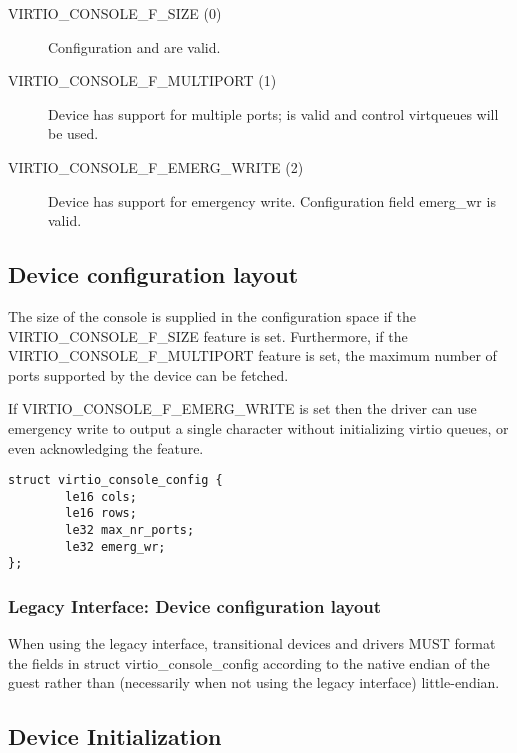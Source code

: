 \begin{description}
\item[VIRTIO_CONSOLE_F_SIZE (0)] Configuration  and 
    are valid.

\item[VIRTIO_CONSOLE_F_MULTIPORT (1)] Device has support for multiple
    ports;  is valid and control virtqueues will be used.

\item[VIRTIO_CONSOLE_F_EMERG_WRITE (2)] Device has support for emergency write.
    Configuration field emerg_wr is valid.
\end{description}

\subsection{Device configuration layout}\label{sec:Device Types / Console Device / Device configuration layout}

  The size of the console is supplied
  in the configuration space if the VIRTIO_CONSOLE_F_SIZE feature
  is set. Furthermore, if the VIRTIO_CONSOLE_F_MULTIPORT feature
  is set, the maximum number of ports supported by the device can
  be fetched.

  If VIRTIO_CONSOLE_F_EMERG_WRITE is set then the driver can use emergency write
  to output a single character without initializing virtio queues, or even
  acknowledging the feature.

\begin{lstlisting}
struct virtio_console_config {
        le16 cols;
        le16 rows;
        le32 max_nr_ports;
        le32 emerg_wr;
};
\end{lstlisting}

\subsubsection{Legacy Interface: Device configuration layout}\label{sec:Device Types / Console Device / Device configuration layout / Legacy Interface: Device configuration layout}
When using the legacy interface, transitional devices and drivers
MUST format the fields in struct virtio_console_config
according to the native endian of the guest rather than
(necessarily when not using the legacy interface) little-endian.

\subsection{Device Initialization}\label{sec:Device Types / Console Device / Device Initialization}

